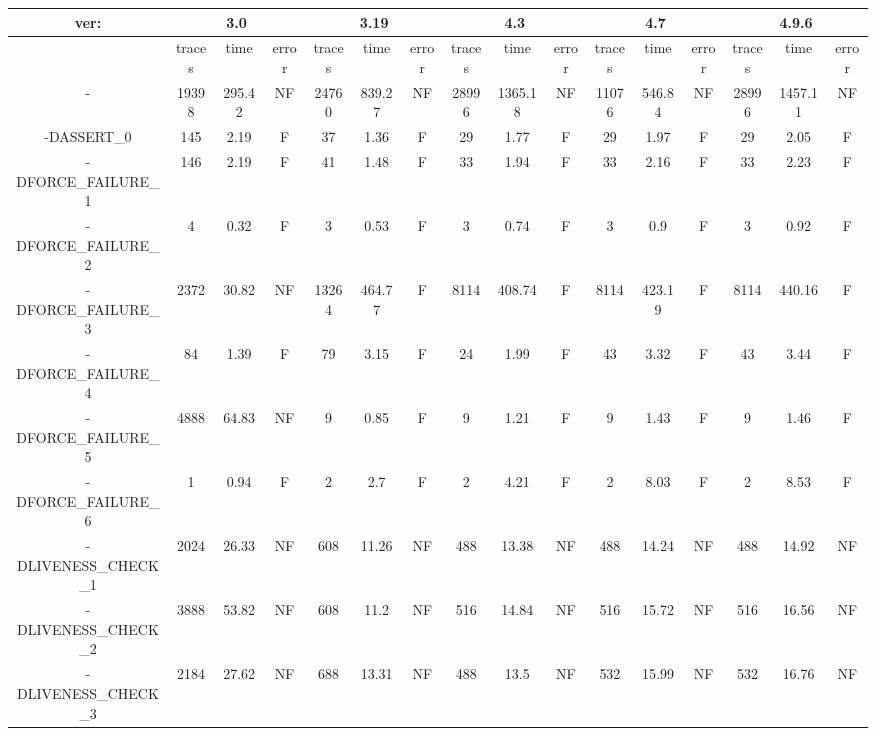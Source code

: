 \begin{tabular}{|c|c|c|c|c|c|c|c|c|c|c|c|c|c|c|c|}
\hline
\multicolumn{1}{|c|}{ver:} & \multicolumn{3}{c|}{3.0} & \multicolumn{3}{c|}{3.19} & \multicolumn{3}{c|}{4.3} & \multicolumn{3}{c|}{4.7} & \multicolumn{3}{c|}{4.9.6} \\
\hline
   & traces & time & error & traces & time & error & traces & time & error & traces & time & error & traces & time & error \\
\hline
- & 19398 & 295.42 & NF & 24760 & 839.27 & NF & 28996 & 1365.18 & NF & 11076 & 546.84 & NF & 28996 & 1457.11 & NF \\
\hline
-DASSERT\_0 & 145 & 2.19 & F & 37 & 1.36 & F & 29 & 1.77 & F & 29 & 1.97 & F & 29 & 2.05 & F \\
\hline
-DFORCE\_FAILURE\_1 & 146 & 2.19 & F & 41 & 1.48 & F & 33 & 1.94 & F & 33 & 2.16 & F & 33 & 2.23 & F \\
\hline
-DFORCE\_FAILURE\_2 & 4 & 0.32 & F & 3 & 0.53 & F & 3 & 0.74 & F & 3 & 0.9 & F & 3 & 0.92 & F \\
\hline
-DFORCE\_FAILURE\_3 & 2372 & 30.82 & NF & 13264 & 464.77 & F & 8114 & 408.74 & F & 8114 & 423.19 & F & 8114 & 440.16 & F \\
\hline
-DFORCE\_FAILURE\_4 & 84 & 1.39 & F & 79 & 3.15 & F & 24 & 1.99 & F & 43 & 3.32 & F & 43 & 3.44 & F \\
\hline
-DFORCE\_FAILURE\_5 & 4888 & 64.83 & NF & 9 & 0.85 & F & 9 & 1.21 & F & 9 & 1.43 & F & 9 & 1.46 & F \\
\hline
-DFORCE\_FAILURE\_6 & 1 & 0.94 & F & 2 & 2.7 & F & 2 & 4.21 & F & 2 & 8.03 & F & 2 & 8.53 & F \\
\hline
-DLIVENESS\_CHECK\_1 & 2024 & 26.33 & NF & 608 & 11.26 & NF & 488 & 13.38 & NF & 488 & 14.24 & NF & 488 & 14.92 & NF \\
\hline
-DLIVENESS\_CHECK\_2 & 3888 & 53.82 & NF & 608 & 11.2 & NF & 516 & 14.84 & NF & 516 & 15.72 & NF & 516 & 16.56 & NF \\
\hline
-DLIVENESS\_CHECK\_3 & 2184 & 27.62 & NF & 688 & 13.31 & NF & 488 & 13.5 & NF & 532 & 15.99 & NF & 532 & 16.76 & NF \\
\hline
\end{tabular}

